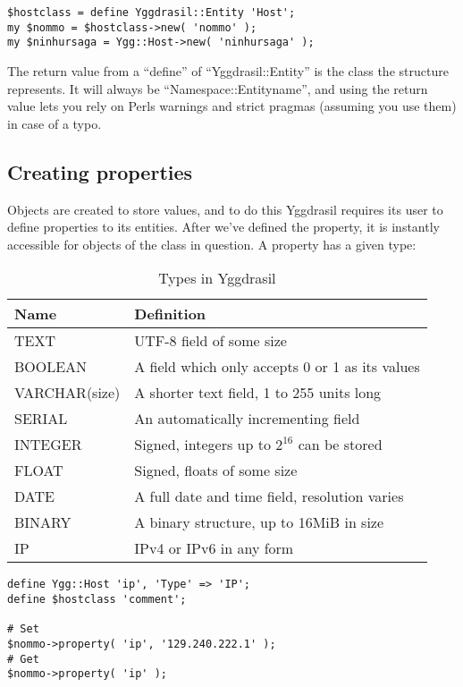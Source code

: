 \documentclass[english,a4paper]{article}
\begin{document}
\lstset{caption=Defining entities,label=entity}
\begin{lstlisting}
$hostclass = define Yggdrasil::Entity 'Host';
my $nommo = $hostclass->new( 'nommo' );
my $ninhursaga = Ygg::Host->new( 'ninhursaga' );
\end{lstlisting}

The return value from a ``define'' of ``Yggdrasil::Entity'' is the
class the structure represents.  It will always be
``Namespace::Entityname'', and using the return value lets you rely on
Perls warnings and strict pragmas (assuming you use them) in case of a
typo.

\subsection{Creating properties}

Objects are created to store values, and to do this Yggdrasil requires
its user to define properties to its entities.  After we've defined
the property, it is instantly accessible for objects of the class in
question.  A property has a given type:

\begin{table}[h]
\centering
\label{types}

\begin{tabular}{l l}
Name & Definition  \\
\hline
TEXT & UTF-8 field of some size \\
BOOLEAN & A field which only accepts 0 or 1 as its values \\
VARCHAR(size) & A shorter text field, 1 to 255 units long \\
SERIAL & An automatically incrementing field \\
INTEGER & Signed, integers up to $2^16$ can be stored \\
FLOAT & Signed, floats of some size \\
DATE & A full date and time field, resolution varies \\
BINARY & A binary structure, up to 16MiB in size\\
IP & IPv4 or IPv6 in any form\\
\end{tabular}
\caption{Types in Yggdrasil}
\end{table}


\lstset{caption=Defining properties,label=properties}
\begin{lstlisting}
define Ygg::Host 'ip', 'Type' => 'IP';
define $hostclass 'comment';

# Set
$nommo->property( 'ip', '129.240.222.1' );
# Get
$nommo->property( 'ip' );
\end{lstlisting}
\end{document}
